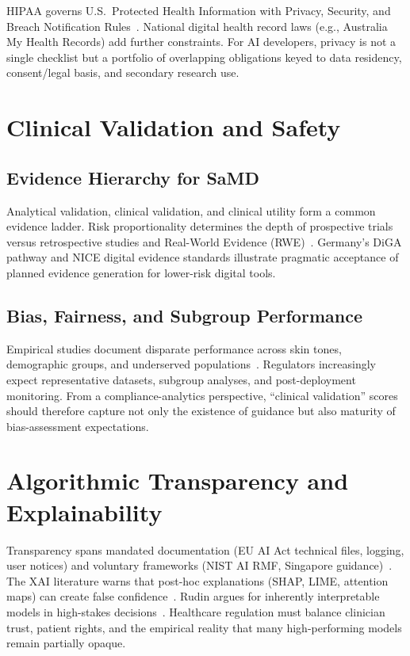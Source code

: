 HIPAA governs U.S.\ Protected Health Information with Privacy, Security, and Breach Notification Rules~\cite{cohen2018}. National digital health record laws (e.g., Australia My Health Records) add further constraints. For AI developers, privacy is not a single checklist but a portfolio of overlapping obligations keyed to data residency, consent/legal basis, and secondary research use.

\section{Clinical Validation and Safety}
\label{sec:validation}

\subsection{Evidence Hierarchy for SaMD}

Analytical validation, clinical validation, and clinical utility form a common evidence ladder. Risk proportionality determines the depth of prospective trials versus retrospective studies and Real-World Evidence (RWE)~\cite{wu2021}. Germany's DiGA pathway and NICE digital evidence standards illustrate pragmatic acceptance of planned evidence generation for lower-risk digital tools.

\subsection{Bias, Fairness, and Subgroup Performance}

Empirical studies document disparate performance across skin tones, demographic groups, and underserved populations~\cite{obermeyer2019,seyedkalantari2021}. Regulators increasingly expect representative datasets, subgroup analyses, and post-deployment monitoring. From a compliance-analytics perspective, ``clinical validation'' scores should therefore capture not only the existence of guidance but also maturity of bias-assessment expectations.

\section{Algorithmic Transparency and Explainability}
\label{sec:xai}

Transparency spans mandated documentation (EU AI Act technical files, logging, user notices) and voluntary frameworks (NIST AI RMF, Singapore guidance)~\cite{nistairmf,euaiact2024}. The XAI literature warns that post-hoc explanations (SHAP, LIME, attention maps) can create false confidence~\cite{ghassemi2021}. Rudin argues for inherently interpretable models in high-stakes decisions~\cite{rudin2019}. Healthcare regulation must balance clinician trust, patient rights, and the empirical reality that many high-performing models remain partially opaque.

